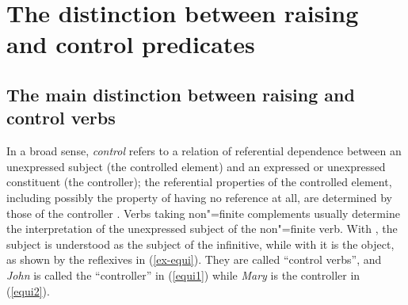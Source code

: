 

\maketitle
\label{chap-control-raising}



\section{The distinction between raising and control predicates}
\label{sec-distinction-raising-control}
\label{control:sec-distinction-control-raising}

\subsection{The main distinction between raising and control verbs}

In a broad sense, \emph{control} refers to a relation of referential dependence between an unexpressed
subject (the controlled element) and an expressed or unexpressed constituent (the controller); the
referential properties of the controlled element, including possibly the property of having no
reference at all,
are determined by those of the controller \citep[372]{Bresnan1982}. Verbs taking
non"=finite complements usually determine the interpretation of the unexpressed subject of the
non"=finite verb. With , the subject is understood as the subject of the infinitive,
while with  it is the object, as shown by the reflexives in (\ref{ex-equi}). They are
called ``control verbs'', and \emph{John} is called the ``controller'' in (\ref{equi1}) while
\emph{Mary} is the controller in (\ref{equi2}).  

